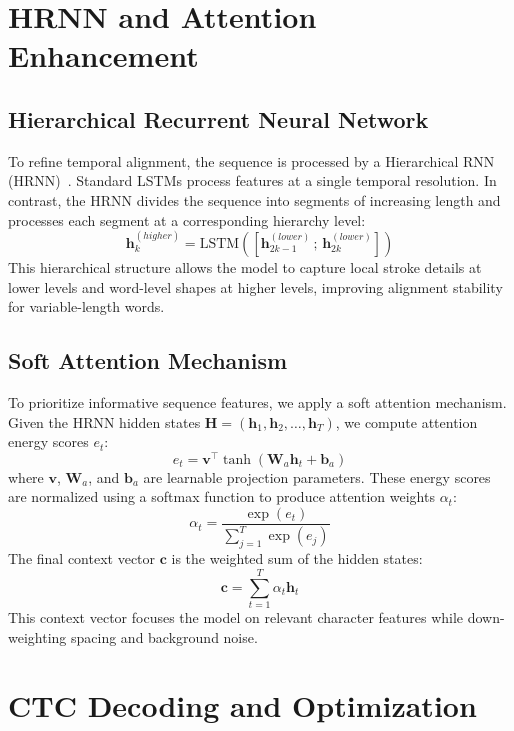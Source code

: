 \section{HRNN and Attention Enhancement}
\subsection{Hierarchical Recurrent Neural Network}
To refine temporal alignment, the sequence is processed by a Hierarchical RNN (HRNN)~\cite{study2024hrnn}. Standard LSTMs process features at a single temporal resolution. In contrast, the HRNN divides the sequence into segments of increasing length and processes each segment at a corresponding hierarchy level:
\begin{equation}
    \mathbf{h}_k^{(higher)} = \text{LSTM}\left( \left[ \mathbf{h}_{2k-1}^{(lower)} \,;\, \mathbf{h}_{2k}^{(lower)} \right] \right)
\end{equation}
This hierarchical structure allows the model to capture local stroke details at lower levels and word-level shapes at higher levels, improving alignment stability for variable-length words.

\subsection{Soft Attention Mechanism}
To prioritize informative sequence features, we apply a soft attention mechanism. Given the HRNN hidden states $\mathbf{H} = (\mathbf{h}_1, \mathbf{h}_2, \dots, \mathbf{h}_T)$, we compute attention energy scores $e_t$:
\begin{equation}
    e_t = \mathbf{v}^\top \tanh\left( \mathbf{W}_a \mathbf{h}_t + \mathbf{b}_a \right)
\end{equation}
where $\mathbf{v}$, $\mathbf{W}_a$, and $\mathbf{b}_a$ are learnable projection parameters. These energy scores are normalized using a softmax function to produce attention weights $\alpha_t$:
\begin{equation}
    \alpha_t = \frac{\exp(e_t)}{\sum_{j=1}^T \exp(e_j)}
\end{equation}
The final context vector $\mathbf{c}$ is the weighted sum of the hidden states:
\begin{equation}
    \mathbf{c} = \sum_{t=1}^T \alpha_t \mathbf{h}_t
\end{equation}
This context vector focuses the model on relevant character features while down-weighting spacing and background noise.

\section{CTC Decoding and Optimization}

